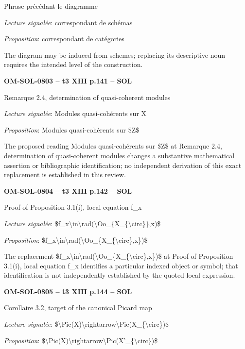Phrase précédant le diagramme\par
\emph{Lecture signalée}: correspondant de schémas\par
\emph{Proposition}: correspondant de catégories\par
The diagram may be induced from schemes; replacing its descriptive noun requires the intended level of the construction.\par
\par\noindent\textbf{OM-SOL-0803 -- t3 XIII p.141 -- SOL}\par
Remarque 2.4, determination of quasi-coherent modules\par
\emph{Lecture signalée}: Modules quasi-cohérents sur X\par
\emph{Proposition}: Modules quasi-cohérents sur \$Z\$\par
The proposed reading Modules quasi-cohérents sur \$Z\$ at Remarque 2.4, determination of quasi-coherent modules changes a substantive mathematical assertion or bibliographic identification; no independent derivation of this exact replacement is established in this review.\par
\par\noindent\textbf{OM-SOL-0804 -- t3 XIII p.142 -- SOL}\par
Proof of Proposition 3.1(i), local equation f\_x\par
\emph{Lecture signalée}: \$f\_x\textbackslash{}in\textbackslash{}rad(\textbackslash{}Oo\_\{X\_\{\textbackslash{}circ\}\},x)\$\par
\emph{Proposition}: \$f\_x\textbackslash{}in\textbackslash{}rad(\textbackslash{}Oo\_\{X\_\{\textbackslash{}circ\},x\})\$\par
The replacement \$f\_x\textbackslash{}in\textbackslash{}rad(\textbackslash{}Oo\_\{X\_\{\textbackslash{}circ\},x\})\$ at Proof of Proposition 3.1(i), local equation f\_x identifies a particular indexed object or symbol; that identification is not independently established by the quoted local expression.\par
\par\noindent\textbf{OM-SOL-0805 -- t3 XIII p.144 -- SOL}\par
Corollaire 3.2, target of the canonical Picard map\par
\emph{Lecture signalée}: \$\textbackslash{}Pic(X)\textbackslash{}rightarrow\textbackslash{}Pic(X\_\{\textbackslash{}circ\})\$\par
\emph{Proposition}: \$\textbackslash{}Pic(X)\textbackslash{}rightarrow\textbackslash{}Pic(X'\_\{\textbackslash{}circ\})\$\par
